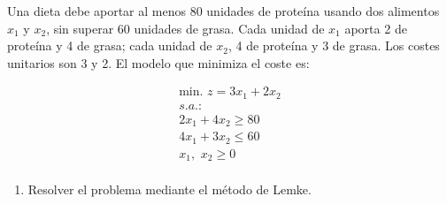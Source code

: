 Una dieta debe aportar al menos 80 unidades de proteína usando dos alimentos
$x_1$ y $x_2$, sin superar 60 unidades de grasa. Cada unidad de $x_1$ aporta 2 de
proteína y 4 de grasa; cada unidad de $x_2$, 4 de proteína y 3 de grasa. Los
costes unitarios son 3 y 2. El modelo que minimiza el coste es:

\begin{equation}
\begin{split}
\label{eq:demo_dieta}
\mbox{min. } z = 3x_1 + 2x_2\\
s.a.:\\
2x_1 + 4x_2 \geq 80\\
4x_1 + 3x_2 \leq 60\\
x_1,\,\,x_2\geq 0\\
\end{split}
\end{equation}

\begin{enumerate}
    \item Resolver el problema mediante el método de Lemke.
\end{enumerate}
